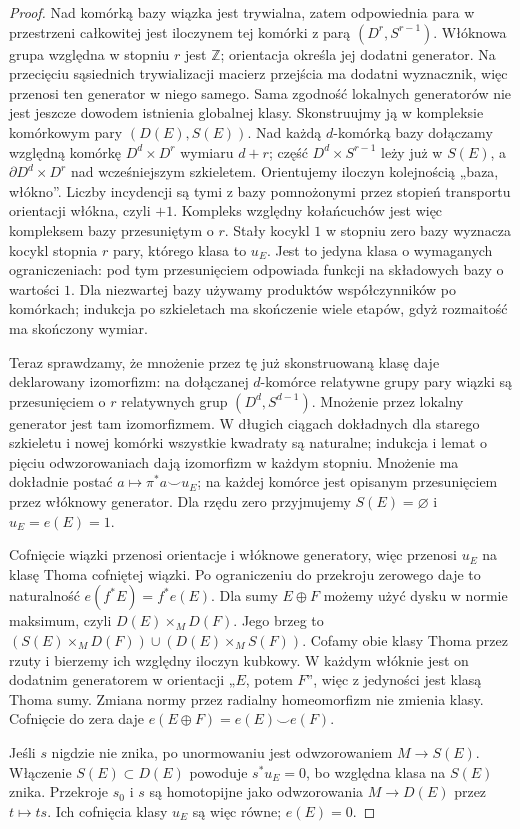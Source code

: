 \documentclass[11pt,a4paper,oneside]{report}
\newcommand{\Z}{\mathbb{Z}}
\theoremstyle{plain}
\theoremstyle{definition}
\theoremstyle{remark}
\begin{document}
\begin{proof}
Nad komórką bazy wiązka jest trywialna, zatem odpowiednia
para w przestrzeni całkowitej jest iloczynem tej komórki
z parą $(D^r,S^{r-1})$.
Włóknowa grupa względna
w stopniu $r$ jest $\Z$;
orientacja określa jej
dodatni generator.
Na przecięciu sąsiednich
trywializacji macierz
przejścia ma dodatni
wyznacznik, więc przenosi
ten generator w niego
samego. Sama zgodność lokalnych generatorów nie jest jeszcze
dowodem istnienia globalnej klasy. Skonstruujmy ją
w kompleksie komórkowym pary $(D(E),S(E))$.
Nad każdą $d$-komórką bazy dołączamy względną
komórkę $D^d\times D^r$ wymiaru $d+r$;
część $D^d\times S^{r-1}$ leży już w $S(E)$,
a $\partial D^d\times D^r$ nad wcześniejszym szkieletem.
Orientujemy iloczyn kolejnością „baza, włókno”.
Liczby incydencji są tymi z bazy pomnożonymi
przez stopień transportu orientacji włókna, czyli $+1$.
Kompleks względny kołańcuchów jest więc kompleksem
bazy przesuniętym o $r$. Stały kocykl $1$ w stopniu
zero bazy wyznacza kocykl stopnia $r$ pary,
którego klasa to $u_E$. Jest to jedyna klasa
o wymaganych ograniczeniach: pod tym przesunięciem
odpowiada funkcji na składowych bazy o wartości $1$.
Dla niezwartej bazy używamy produktów współczynników
po komórkach; indukcja po szkieletach ma skończenie
wiele etapów, gdyż rozmaitość ma skończony wymiar.

Teraz sprawdzamy, że mnożenie przez tę już
skonstruowaną klasę daje deklarowany izomorfizm:
na dołączanej $d$-komórce
relatywne grupy pary
wiązki są przesunięciem
o $r$ relatywnych grup
$(D^d,S^{d-1})$.
Mnożenie przez lokalny
generator jest tam
izomorfizmem. W długich
ciągach dokładnych
dla starego szkieletu
i nowej komórki wszystkie
kwadraty są naturalne;
indukcja i lemat o
pięciu odwzorowaniach
dają izomorfizm w
każdym stopniu.
Mnożenie ma dokładnie postać
$a\mapsto\pi^*a\smile u_E$; na każdej komórce
jest opisanym przesunięciem przez włóknowy generator.
Dla rzędu zero przyjmujemy $S(E)=\varnothing$
i $u_E=e(E)=1$.

Cofnięcie wiązki przenosi
orientacje i włóknowe
generatory, więc przenosi
$u_E$ na klasę Thoma
cofniętej wiązki. Po
ograniczeniu do
przekroju zerowego
daje to naturalność
$e(f^*E)=f^*e(E)$.
Dla sumy $E\oplus F$ możemy użyć dysku w normie
maksimum, czyli $D(E)\times_M D(F)$. Jego brzeg to
$(S(E)\times_M D(F))\cup(D(E)\times_M S(F))$.
Cofamy obie klasy Thoma przez rzuty i bierzemy
ich względny iloczyn kubkowy. W każdym włóknie
jest on dodatnim generatorem w orientacji „$E$, potem $F$”,
więc z jedyności jest klasą Thoma sumy.
Zmiana normy przez radialny homeomorfizm nie zmienia
klasy. Cofnięcie do zera daje
$e(E\oplus F)=e(E)\smile e(F)$.

Jeśli $s$ nigdzie
nie znika, po unormowaniu
jest odwzorowaniem
$M\to S(E)$.
Włączenie $S(E)\subset D(E)$
powoduje $s^*u_E=0$,
bo względna klasa
na $S(E)$ znika.
Przekroje $s_0$ i $s$
są homotopijne jako
odwzorowania $M\to D(E)$
przez $t\mapsto ts$.
Ich cofnięcia klasy
$u_E$ są więc równe;
$e(E)=0$.
\end{proof}
\end{document}
